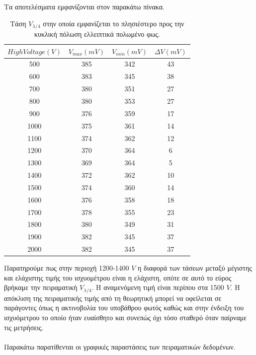 \documentclass[a4paper,11pt,titlepage]{article}
\begin{document}
Τα αποτελέσματα εμφανίζονται στον παρακάτω πίνακα.
\newpage
\begin{table} [!hbp]
\centering
\begin{tabular}{|c|c|c|c|}
\hline \rule[-2ex]{0pt}{5.5ex} $High Voltage (V)$ & $V_{max} (mV)$ & $V_{min} (mV)$ & $\Delta V (mV)$ \\ 
\hline \rule[-2ex]{0pt}{5.5ex} 500 & 385 & 342 & 43 \\ 
\hline \rule[-2ex]{0pt}{5.5ex} 600 & 383 & 345 & 38 \\ 
\hline \rule[-2ex]{0pt}{5.5ex} 700 & 380 & 351 & 27\\ 
\hline \rule[-2ex]{0pt}{5.5ex} 800 & 380 & 353 & 27 \\ 
\hline \rule[-2ex]{0pt}{5.5ex} 900 & 376 & 359 & 17 \\ 
\hline \rule[-2ex]{0pt}{5.5ex} 1000 & 375 & 361 & 14 \\ 
\hline \rule[-2ex]{0pt}{5.5ex} 1100 & 374 & 362 & 12 \\ 
\hline \rule[-2ex]{0pt}{5.5ex} 1200 & 370 & 364 & 6 \\ 
\hline \rule[-2ex]{0pt}{5.5ex} 1300 & 369 & 364 & 5 \\ 
\hline \rule[-2ex]{0pt}{5.5ex} 1400 & 372 & 362 & 10 \\ 
\hline \rule[-2ex]{0pt}{5.5ex} 1500 & 374 & 360 & 14 \\ 
\hline \rule[-2ex]{0pt}{5.5ex} 1600 & 376 & 358 & 18 \\ 
\hline \rule[-2ex]{0pt}{5.5ex} 1700 & 378 & 355 & 23 \\ 
\hline \rule[-2ex]{0pt}{5.5ex} 1800 & 380 & 349 & 31 \\ 
\hline \rule[-2ex]{0pt}{5.5ex} 1900 & 382 & 345 & 37 \\ 
\hline \rule[-2ex]{0pt}{5.5ex} 2000 & 382 & 345 & 37 \\ 
\hline 
\end{tabular} 
\caption{Τάση $V_{\lambda/4}$ στην οποία εμφανίζεται το πλησιέστερο προς την κυκλική πόλωση ελλειπτικά πολωμένο φως.}
\end{table}

Παρατηρούμε πως στην περιοχή 1200-1400 $V$ η διαφορά των τάσεων μεταξύ μέγιστης και ελάχιστης τιμής του ισχυομέτρου είναι η ελάχιστη, οπότε σε αυτό το εύρος βρήκαμε την  πειραματική $V_{\lambda/4}$. Η αναμενόμενη τιμή είναι περίπου στα 1500 $V$. Η απόκλιση της πειραματικής τιμής από τη θεωρητική μπορεί να οφείλεται σε παράγοντες όπως η ακτινοβολία του υποβάθρου φωτός καθώς και στην ένδειξη του ισχυόμετρου το οποίο ήταν ευαίσθητο και συνεπώς όχι τόσο σταθερό όταν παίρναμε τις μετρήσεις. 
\\\\
Παρακάτω παρατίθενται οι γραφικές παραστάσεις των πειραματικών δεδομένων.
\end{document}
